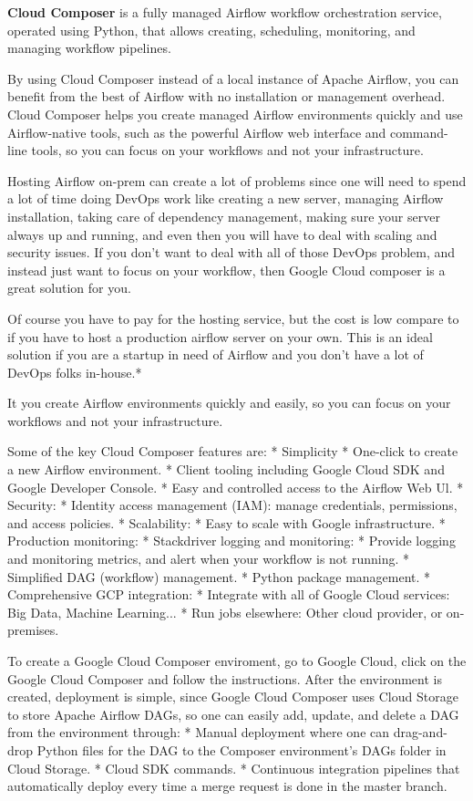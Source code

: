 \textbf{Cloud Composer} is a fully managed Airflow workflow orchestration service, operated using Python, that allows
creating, scheduling, monitoring, and managing workflow pipelines.
\ed

By using Cloud Composer instead of a local instance of Apache Airflow, you can benefit from the best of Airflow with
no installation or management overhead. Cloud Composer helps you create managed Airflow environments quickly and use
Airflow-native tools, such as the powerful Airflow web interface and command-line tools, so you can focus on your
workflows and not your infrastructure.

Hosting Airflow on-prem can create a lot of problems since one will need to spend a lot of time doing
DevOps work like creating a new server, managing Airflow installation, taking care of dependency management, making
sure your server always up and running, and even then you will have to deal with scaling and security issues. If you
don't want to deal with all of those DevOps problem, and instead just want to focus on your workflow, then Google
Cloud composer is a great solution for you.

Of course you have to pay for the hosting service, but the cost is low compare to if you have to host a production
airflow server on your own. This is an ideal solution if you are a startup in need of Airflow and you don't have a
lot of DevOps folks in-house.*

It you create Airflow environments quickly and easily, so you can focus on your workflows and not your
infrastructure.

Some of the key Cloud Composer features are:
* Simplicity
    * One-click to create a new Airflow environment.
    * Client tooling including Google Cloud SDK and Google Developer Console.
    * Easy and controlled access to the Airflow Web Ul.
* Security:
    * Identity access management (IAM): manage credentials, permissions, and access policies.
* Scalability:
    * Easy to scale with Google infrastructure.
* Production monitoring:
    * Stackdriver logging and monitoring:
        * Provide logging and monitoring metrics, and alert when your workflow is not running.
    * Simplified DAG (workflow) management.
    * Python package management.
* Comprehensive GCP integration:
    * Integrate with all of Google Cloud services: Big Data, Machine Learning...
    * Run jobs elsewhere: Other cloud provider, or on-premises.

To create a Google Cloud Composer enviroment, go to Google Cloud, click on the Google Cloud Composer and follow the instructions. After the environment is created, deployment is simple, since Google Cloud Composer uses Cloud Storage to store Apache Airflow DAGs, so one can easily add, update, and delete a DAG from the environment through:
* Manual deployment where one can drag-and-drop Python files for the DAG to the Composer environment's DAGs folder in Cloud Storage.
* Cloud SDK commands.
* Continuous integration pipelines that automatically deploy every time a merge request is done in the master branch.